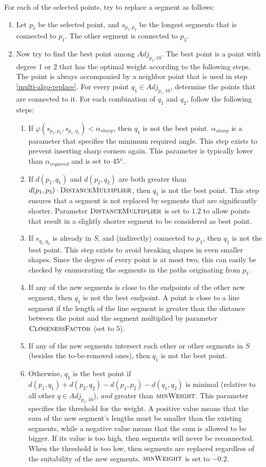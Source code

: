 \documentclass[11pt]{article}
\begin{document}
For each of the selected points, try to replace a segment as follows:

\begin{enumerate}
\item Let $p_1$ be the selected point, and $s_{p_1,p_2}$ be the longest segments that is connected to $p_1$. The other segment is connected to $p_3$.
\item Now try to find the best point among $Adj_{p_1,10}$. The best point is a point with degree 1 or 2 that has the optimal weight according to the following steps. The point is always accompanied by a neighbor point that is used in step \ref{multi-algo-replace}.
For every point $q_1 \in Adj_{p_1,10}$, determine the points that are connected to it. For each combination of $q_1$ and $q_2$, follow the following steps:
  \begin{enumerate}
  \item If $\varphi(s_{p_1,p_3}, s_{p_1,q_1}) < \alpha_{sharp}$, then $q_1$ is not the best point. $\alpha_{sharp}$ is a parameter that specifies the minimum required angle. This step exists to prevent inserting sharp corners again. This parameter is typically lower than $\alpha_{required}$ and is set to $45\degree$.
  \item If $d(p_1, q_1)$ and $d(p_2,q_2)$ are both greater than $d(p_1,p_3) \cdot \textsc{DistanceMultiplier}$, then $q_1$ is not the best point.
  This step ensures that a segment is not replaced by segments that are significantly shorter.
  Parameter $\textsc{DistanceMultiplier}$ is set to $1.2$ to allow points that result in a slightly shorter segment to be considered as best point.
  \item If $s_{q_1,q_2}$ is already in $S$, and (indirectly) connected to $p_1$, then $q_1$ is not the best point. This step exists to avoid breaking shapes in even smaller shapes. Since the degree of every point is at most two, this can easily be checked by enumerating the segments in the paths originating from $p_1$.
  \item If any of the new segments is close to the endpoints of the other new segment, then $q_1$ is not the best endpoint. A point is close to a line segment if the length of the line segment is greater than the distance between the point and the segment multiplied by parameter $\textsc{ClosenessFactor}$ (set to $5$).
  \item If any of the new segments intersect each other or other segments in $S$ (besides the to-be-removed ones), then $q_1$ is not the best point.
  \item Otherwise, $q_1$ is the best point if $d(p_1,q_1) + d(p_2,q_2) - d(p_1,p_2) - d(q_1,q_2)$ is minimal (relative to all other $q \in Adj_{p_1,10}$), \textit{and} greater than $\textsc{minWeight}$. This parameter specifies the threshold for the weight. A positive value means that the sum of the new segment's lengths must be smaller than the existing segments, while a negative value means that the sum is allowed to be bigger. If its value is too high, then segments will never be reconnected. When the threshold is too low, then segments are replaced regardless of the suitability of the new segments. $\textsc{minWeight}$ is set to $-0.2$.
  \end{enumerate}


\end{enumerate}
\end{document}
